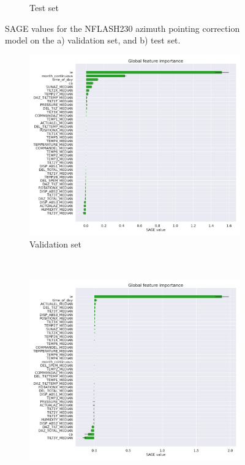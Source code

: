 \begin{figure}[H]
\begin{subfigure}[t]{0.92\textwidth}
       \caption{Test set}
       \label{subfig:sage_lastfold_nflash230_az_test}
    \end{subfigure}
    \caption[SAGE values for NFLASH230 elevation pointing correction model]{SAGE values for the NFLASH230 azimuth pointing correction model on the a) validation set, and b) test set.}
    \label{fig:sage_lastfold_nflash230_az}
\end{figure}

\begin{figure}[H]
    \centering
    \begin{subfigure}[t]{0.92\textwidth}
        \centering
        \includegraphics[width=\textwidth]{Results/XGB_ds2_tp5_k40_uncorr_el_val_SAGE.pdf}
        \caption{Validation set}
        \label{subfig:sage_lastfold_nflash230_el_val}
    \end{subfigure}
    \\
    \begin{subfigure}[t]{0.92\textwidth}
       \centering
       \includegraphics[width=1\textwidth]{Results/XGB_ds2_tp5_k40_uncorr_el_test_SAGE.pdf}

\end{subfigure}
\end{figure}
